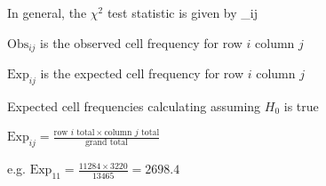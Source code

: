 \item In general, the $\chi^2$ test statistic is given by
\beq
\sum_{ij} 
\eeq
\item $\textrm{Obs}_{ij}$ is the observed cell frequency for row $i$ column $j$
\item $\textrm{Exp}_{ij}$ is the expected cell frequency for row $i$ column $j$
  \bi
  \item Expected cell frequencies calculating assuming $H_0$ is true
  \item $\textrm{Exp}_{ij} = \frac{\textrm{row $i$ total} \times \textrm{column $j$ total}}{\textrm{grand total}}$
  \item e.g. $\textrm{Exp}_{11} = \frac{11284 \times 3220}{13465} = 2698.4$
  \ei

